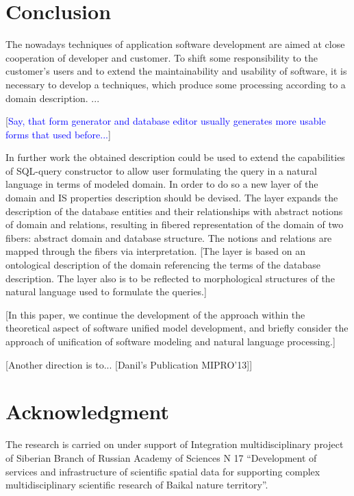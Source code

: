 \documentclass[conference]{IEEEtran}
\newcommand{\e}[2][fcolor]{\textcolor{pcolor}{[}\textcolor{#1}{#2}\textcolor{pcolor}{]}}
\begin{document}
\section{Conclusion}

The nowadays techniques of application software development are aimed at close cooperation of developer and customer.  To shift some responsibility to the customer's users and to extend the maintainability and usability of software, it is necessary to develop a techniques, which produce some processing according to a domain description.  ...

\e[blue]{Say, that form generator and database editor usually generates more usable forms that used before...}

In further work the obtained description could be used to extend the capabilities of SQL-query constructor to allow user formulating the query in a natural language in terms of modeled domain.  In order to do so a new layer of the domain and IS properties description should be devised.  The layer expands the description of the database entities and their relationships with abstract notions of domain and relations, resulting in fibered representation of the domain of two fibers: abstract domain and database structure.  The notions and relations are mapped through the fibers via interpretation.  \e{The layer is based on an ontological description of the domain referencing the terms of the database description.  The layer also is to be reflected to morphological structures of the natural language used to formulate the queries.}

\e{In this paper, we continue the development of the approach
\cite{fereferovDiss} within the theoretical aspect \cite{b2:15} of software unified model development, and briefly consider the approach of unification of software modeling and natural language processing.}

\e{Another direction is to... [Danil's Publication MIPRO'13]}



\section*{Acknowledgment}
The research is carried on under support of Integration multidisciplinary project of Siberian Branch of Russian Academy of Sciences N 17 “Development of services and infrastructure of scientific spatial data for supporting complex multidisciplinary scientific research of Baikal nature territory”.
\end{document}
